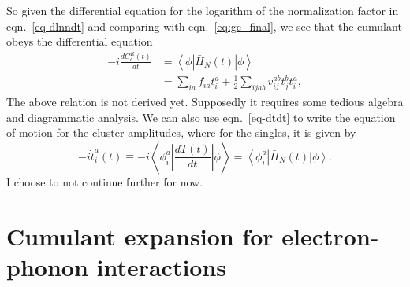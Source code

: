 So given the differential equation for the logarithm of the normalization factor in eqn.~\ref{eq-dlnndt} and comparing with eqn.~\ref{eq:gc_final}, we see that the cumulant obeys the differential equation
\begin{equation}
\label{eqn:matel1}
\begin{split}
-i\frac{d C_c^R(t)}{dt} &= \left< \phi \left| \bar{H}_N(t) \right| \phi \right> \\
&= \sum_{ia} f_{ia} t_i^a +
\frac{1}{2} \sum_{ijab} v_{ij}^{ab} t_j^b t_i^a,
\end{split}
\end{equation}
\color{red} {The above relation is not derived yet. Supposedly it requires some tedious
algebra and diagrammatic analysis.} \color{black} We can also use eqn.~\ref{eq-dtdt} to write the equation of motion for the cluster amplitudes, where for the singles, it is given by
\begin{equation}
\label{eq:rt_eom_ccs}
-i \dot {t}_i^a(t) \equiv -i \left< \phi_{i}^{a} \left| \frac{d T(t)}{dt} \right| \phi \right>
= \left< \phi_{i}^{a} \right| \bar{H}_N(t) \left| \phi \right>.
\end{equation}
I choose to not continue further for now.


\section{Cumulant expansion for electron-phonon interactions}
